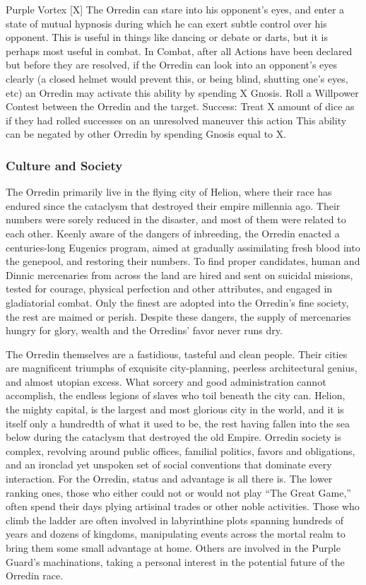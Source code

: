 \documentclass[oneside,11pt,english]{book}
\begin{document}
Purple Vortex [X] %
The Orredin can stare into his opponent’s eyes, and enter a state of mutual hypnosis during which he can 
exert subtle control over his opponent. This is useful in things like dancing or debate or darts, but it is 
perhaps most useful in combat. 
In Combat, after all Actions have been declared but before they are resolved, if the Orredin can look into 
an opponent’s eyes clearly (a closed helmet would prevent this, or being blind, shutting one’s eyes, etc) 
an Orredin may activate this ability by spending X Gnosis. Roll a Willpower Contest between the Orredin 
and the target. 
Success: Treat X amount of dice as if they had rolled successes on an unresolved maneuver this action 
This ability can be negated by other Orredin by spending Gnosis equal to X. 
\subsubsection*{Culture and Society} 
The Orredin primarily live in the flying city of Helion, where their race has endured since the cataclysm 
that destroyed their empire millennia ago. Their numbers were sorely reduced in the disaster, and most of 
them were related to each other. Keenly aware of the dangers of inbreeding, the Orredin enacted a 
centuries-long Eugenics program, aimed at gradually assimilating fresh blood into the genepool, and 
restoring their numbers. To find proper candidates, human and Dinnic mercenaries from across the land 
are hired and sent on suicidal missions, tested for courage, physical perfection and other attributes, and 
engaged in gladiatorial combat. Only the finest are adopted into the Orredin’s fine society, the rest are 
maimed or perish. Despite these dangers, the supply of mercenaries hungry for glory, wealth and the 
Orredins’ favor never runs dry. 


The Orredin themselves are a fastidious, tasteful and clean people. Their cities are magnificent triumphs 
of exquisite city-planning, peerless architectural genius, and almost utopian excess. What sorcery and 
good administration cannot accomplish, the endless legions of slaves who toil beneath the city can. 
Helion, the mighty capital, is the largest and most glorious city in the world, and it is itself only a 
hundredth of what it used to be, the rest having fallen into the sea below during the cataclysm that 
destroyed the old Empire. 
Orredin society is complex, revolving around public offices, familial politics, favors and obligations, and 
an ironclad yet unspoken set of social conventions that dominate every interaction. For the Orredin, status 
and advantage is all there is. The lower ranking ones, those who either could not or would not play “The 
Great Game,” often spend their days plying artisinal trades or other noble activities. Those who climb the 
ladder are often involved in labyrinthine plots spanning hundreds of years and dozens of kingdoms, 
manipulating events across the mortal realm to bring them some small advantage at home. Others are 
involved in the Purple Guard’s machinations, taking a personal interest in the potential future of the 
Orredin race. 
\end{document}
